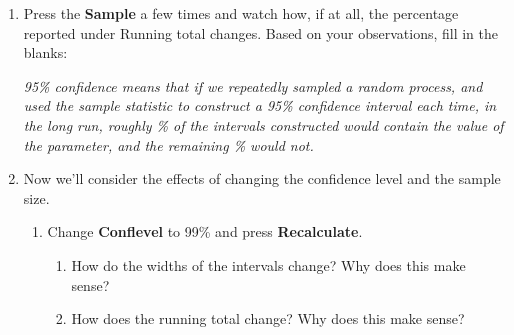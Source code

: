 \documentclass{amsart}
\begin{document}
\begin{Form}
\begin{enumerate}
\item Press the {\bf Sample} a few times and watch how, if at all, the percentage reported under Running total changes. Based on your observations, fill in the blanks:
\bigskip

\noindent \emph{95\% confidence means that if we repeatedly sampled a random process, and used the sample statistic to construct a 95\% confidence interval each time, in the long run, roughly \TextField[name=q5k,width=30pt]{} \% of the intervals constructed would contain the value of the parameter, and the remaining \TextField[name=q5l,width=30pt]{} \% would not.}

\bigskip

\item Now we'll consider the effects of changing the confidence level and the sample size.
\begin{enumerate}
\item Change {\bf Conflevel} to 99\% and press {\bf Recalculate}. 
\begin{enumerate}
\item How do the widths of the intervals change? Why does this make sense?\\
 \TextField[name=q6a,width=0.8\textwidth]{}
 
\item How does the running total change? Why does this make sense?\\
 \TextField[name=q6b,width=0.8\textwidth]{}


\end{enumerate}
\end{enumerate}
\end{enumerate}
\end{Form}
\end{document}
